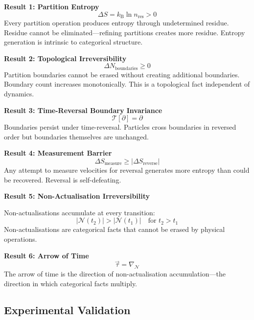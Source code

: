 \documentclass[twocolumn,10pt]{article}
\theoremstyle{definition}
\theoremstyle{remark}
\newcommand{\kB}{k_{\mathrm{B}}}
\begin{document}
\textbf{Result 1: Partition Entropy}
\begin{equation}
\Delta S = \kB \ln n_{\text{res}} > 0
\end{equation}
Every partition operation produces entropy through undetermined residue. Residue cannot be eliminated---refining partitions creates more residue. Entropy generation is intrinsic to categorical structure.

\textbf{Result 2: Topological Irreversibility}
\begin{equation}
\Delta N_{\text{boundaries}} \geq 0
\end{equation}
Partition boundaries cannot be erased without creating additional boundaries. Boundary count increases monotonically. This is a topological fact independent of dynamics.

\textbf{Result 3: Time-Reversal Boundary Invariance}
\begin{equation}
\mathcal{T}[\partial] = \partial
\end{equation}
Boundaries persist under time-reversal. Particles cross boundaries in reversed order but boundaries themselves are unchanged.

\textbf{Result 4: Measurement Barrier}
\begin{equation}
\Delta S_{\text{measure}} \geq |\Delta S_{\text{reverse}}|
\end{equation}
Any attempt to measure velocities for reversal generates more entropy than could be recovered. Reversal is self-defeating.

\textbf{Result 5: Non-Actualisation Irreversibility}

Non-actualisations accumulate at every transition:
\begin{equation}
|\mathcal{N}(t_2)| > |\mathcal{N}(t_1)| \quad \text{for } t_2 > t_1
\end{equation}
Non-actualisations are categorical facts that cannot be erased by physical operations.

\textbf{Result 6: Arrow of Time}
\begin{equation}
\vec{\tau} = \nabla_{\mathcal{N}}
\end{equation}
The arrow of time is the direction of non-actualisation accumulation---the direction in which categorical facts multiply.

\subsection{Experimental Validation}
\end{document}
